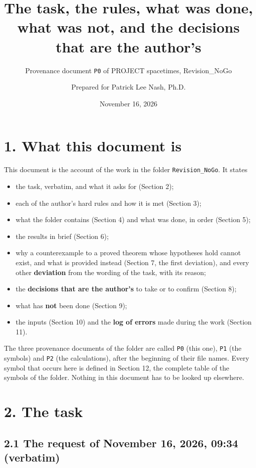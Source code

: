 \documentclass[
  10pt,
]{article}
\title{The task, the rules, what was done, what was not, and the
decisions that are the author's}
\subtitle{Provenance document \texttt{P0} of PROJECT spacetimes,
Revision\_NoGo}
\author{Prepared for Patrick Lee Nash, Ph.D.}
\date{November 16, 2026}
\providecommand{\tightlist}{%
  \setlength{\itemsep}{0pt}\setlength{\parskip}{0pt}}
\begin{document}
\maketitle

\hypertarget{what-this-document-is}{%
\section{1. What this document is}\label{what-this-document-is}}

This document is the account of the work in the folder
\texttt{Revision\_NoGo}. It states

\begin{itemize}
\tightlist
\item
  the task, verbatim, and what it asks for (Section 2);
\item
  each of the author's hard rules and how it is met (Section 3);
\item
  what the folder contains (Section 4) and what was done, in order
  (Section 5);
\item
  the results in brief (Section 6);
\item
  why a counterexample to a proved theorem whose hypotheses hold cannot
  exist, and what is provided instead (Section 7, the first deviation),
  and every other \textbf{deviation} from the wording of the task, with
  its reason;
\item
  the \textbf{decisions that are the author's} to take or to confirm
  (Section 8);
\item
  what has \textbf{not} been done (Section 9);
\item
  the inputs (Section 10) and the \textbf{log of errors} made during the
  work (Section 11).
\end{itemize}

The three provenance documents of the folder are called \texttt{P0}
(this one), \texttt{P1} (the symbols) and \texttt{P2} (the
calculations), after the beginning of their file names. Every symbol
that occurs here is defined in Section 12, the complete table of the
symbols of the folder. Nothing in this document has to be looked up
elsewhere.

\hypertarget{the-task}{%
\section{2. The task}\label{the-task}}

\hypertarget{the-request-of-november-16-2026-0934-verbatim}{%
\subsection{2.1 The request of November 16, 2026, 09:34
(verbatim)}\label{the-request-of-november-16-2026-0934-verbatim}}
\end{document}
